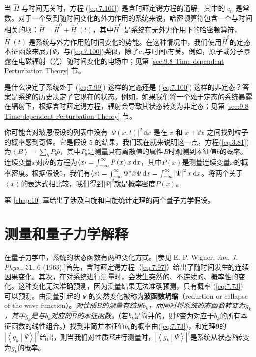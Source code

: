     当 $\hat{H}$ 与时间无关时，方程 (\ref{eq:7.100}) 是含时薛定谔方程的通解，其中的 $c_n$ 是常数。对于一个受到随时间变化的外力作用的系统来说，哈密顿算符包含一个与时间相关的项：$\hat{H} = \hat{H}^0 + \hat{H}^{\prime}\left(t\right)$，其中$\hat{H}^0$ 是系统在无外力作用下的哈密顿算符，$\hat{H}^{\prime}\left(t\right)$ 是系统与外力作用随时间变化的势能。在这种情况中，我们使用$\hat{H}^0$的定态本征函数来展开$\Psi$，与(\ref{eq:7.100})类似，除了$c_n$与时间$t$有关。例如，原子或分子暴露在电磁辐射（光）随时间变化的电场中；见第 \ref{sec:9.8 Time-dependent Perturbation Theory} 节。

    是什么决定了系统处于 (\ref{eq:7.99}) 这样的定态还是 (\ref{eq:7.100}) 这样的非定态？答案是系统的历史决定了它现在的状态。例如，如果我们将一个处于定态的系统暴露在辐射下，根据含时薛定谔方程，辐射会导致其状态转变为非定态；见第 \ref{sec:9.8 Time-dependent Perturbation Theory} 节。

    你可能会对玻恩假设的列表中没有 $\left|\Psi\left(x,t\right)\right|^2\:\dd x$ 是在 $x$ 和 $x+\dd x$ 之间找到粒子的概率感到奇怪。它是假设 5 的结果，我们现在就来说明这一点。方程(\ref{eq:3.81})为$\left\langle B \right\rangle = \sum_{b}P_bb$，其中$P_b$是测量具有离散值的属性$B$时观测到本征值$b$的概率。连续变量$x$对应的方程为$\left\langle x \right\rangle = \int_{-\infty}^{\infty} P\left(x\right)x\:\dd x$，其中$P\left(x\right)$是测量连续变量$x$的概率密度。根据假设5，我们有$\left\langle x \right\rangle= \int_{-\infty}^{\infty} \Psi^{\ast}\hat{x}\Psi\:\dd x = \int_{-\infty}^{\infty} \left|\Psi\right|^2x\:\dd x$。将两个关于$\left\langle x \right\rangle$的表达式相比较，我们得到$\left|\Psi\right|^2$就是概率密度$P\left(x\right)$。

    第 \ref{chap:10} 章给出了涉及自旋和自旋统计定理的两个量子力学假设。

\section{测量和量子力学解释}
\label{sec:7.9 Measurement and the Interpretation of Quantum Mechanics}
    在量子力学中，系统的状态函数有两种变化方式。[参见 E. P. Wigner, \textit{Am. J. Phys.}, \textbf{31}, 6 (1963).]首先，含时薛定谔方程（\ref{eq:7.97}）给出了随时间发生的连续因果变化。其次，在对系统进行测量时，会发生突然的、不连续的、概率性的变化。这种变化无法准确预测，因为测量结果无法准确预测，只有概率 (\ref{eq:7.73}) 可以预测。由测量引起的 $\Psi$ 的突然变化被称为\textbf{波函数坍缩}（reduction or collapse of the wave function）。\textit{对性质$B$的测量有结果$b_k$，而同时将系统的态函数转变为$g_k$，其中$g_k$是与$b_k$对应的$\hat{B}$的本征函数。}（若$b_k$是简并的，则$\Psi$变为对应于$b_k$的所有本征函数的线性组合。）找到非简并本征值$b_k$的概率由(\ref{eq:7.73})，和定理9的$\left|\left\langle g_k \middle| \Psi \right\rangle\right|^2$给出，则当我们对性质$B$进行测量时，$\left|\left\langle g_k \middle| \Psi \right\rangle\right|^2$是系统从状态$\Psi$转变为$g_k$的概率。

